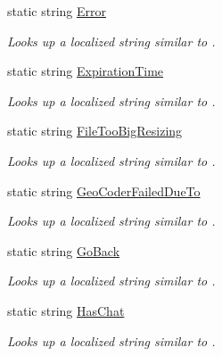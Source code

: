 \begin{DoxyCompactItemize}
static string \hyperlink{class_wis_r_1_1_app___resources_1_1_resource_a4486cffa4a7434f0dc98372bc596a455}{Error}
\begin{DoxyCompactList}\small\item\em Looks up a localized string similar to . \end{DoxyCompactList}\item 
static string \hyperlink{class_wis_r_1_1_app___resources_1_1_resource_ab66b631e7db04b7054b799b76a04b245}{Expiration\+Time}
\begin{DoxyCompactList}\small\item\em Looks up a localized string similar to . \end{DoxyCompactList}\item 
static string \hyperlink{class_wis_r_1_1_app___resources_1_1_resource_ac60ef8ccb4d4d925c67924e267a752bd}{File\+Too\+Big\+Resizing}
\begin{DoxyCompactList}\small\item\em Looks up a localized string similar to . \end{DoxyCompactList}\item 
static string \hyperlink{class_wis_r_1_1_app___resources_1_1_resource_a8525ce49131765342e2cfb591210c3f5}{Geo\+Coder\+Failed\+Due\+To}
\begin{DoxyCompactList}\small\item\em Looks up a localized string similar to . \end{DoxyCompactList}\item 
static string \hyperlink{class_wis_r_1_1_app___resources_1_1_resource_adc199eadb65736d04b73511d3eaa232d}{Go\+Back}
\begin{DoxyCompactList}\small\item\em Looks up a localized string similar to . \end{DoxyCompactList}\item 
static string \hyperlink{class_wis_r_1_1_app___resources_1_1_resource_ab724c7cb67510e7fbd6d2e4d863ed8d7}{Has\+Chat}
\begin{DoxyCompactList}\small\item\em Looks up a localized string similar to . \end{DoxyCompactList}\item 

\end{DoxyCompactItemize}
